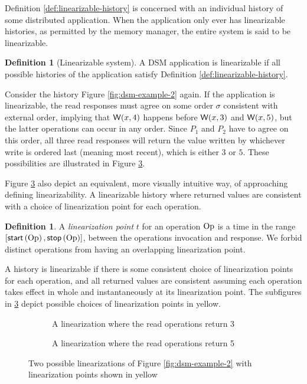 \documentclass[]             %
{NASA}                       %
\theoremstyle{definition}
\newtheorem{definition}[theorem]{Definition}
\begin{document}
Definition \ref{def:linearizable-history} is concerned with an individual
history of some distributed application. When the application only
ever has linearizable histories, as permitted by the memory manager,
the entire system is said to be linearizable.

\begin{definition}[Linearizable system]
  \label{def:linearizable-system}
  A DSM application is linearizable if all possible histories of the
  application satisfy Definition \ref{def:linearizable-history}.
\end{definition}

Consider the history Figure \ref{fig:dsm-example-2} again. If the
application is linearizable, the read responses must agree on some
order $\sigma$ consistent with external order, implying that
$\mathsf{W}\!\left(x, 4\right)$ happens before $\mathsf{W}\!\left(x, 3\right)$ and
$\mathsf{W}\!\left(x, 5\right)$, but the latter operations can occur in any
order. Since $P_1$ and $P_2$ have to agree on this order, all three
read responses will return the value written by whichever write is
ordered last (meaning most recent), which is either $3$ or $5$. These
possibilities are illustrated in Figure
\ref{fig:dsm-example-2-linearizations}.

Figure \ref{fig:dsm-example-2-linearizations} also depict an
equivalent, more visually intuitive way, of approaching defining
linearizability. A linearizable history where returned values are
consistent with a choice of linearization point for each operation.
\begin{definition}
  A \emph{linearization point} $t$ for an operation $\mathrm{Op}$ is a time in
  the range $[\mathsf{start}\left(\mathrm{Op}\right), \mathsf{stop}\left(\mathrm{Op}\right)]$, between the operations
  invocation and response. We forbid distinct operations from having
  an overlapping linearization point.
\end{definition}

A history is linearizable if there is some consistent choice of
linearization points for each operation, and all returned values are
consistent assuming each operation takes effect in whole and
instantaneously at its linearization point. The subfigures in
\ref{fig:dsm-example-2-linearizations} depict possible choices of
linearization points in yellow.

\begin{figure}
  \begin{subfigure}{1\textwidth}
    \setlength\belowcaptionskip{4ex}
    \centering
    
    \caption{A linearization where the read operations return 3}
    \label{fig:dsm-example-2-linearizations-1}
  \end{subfigure}
  \begin{subfigure}{1\textwidth}
    
        \caption{A linearization where the read operations return 5}
    \label{fig:dsm-example-2-linearizations-b}
  \end{subfigure}
  \caption{Two possible linearizations of Figure \ref{fig:dsm-example-2} with linearization points shown in yellow}
  \label{fig:dsm-example-2-linearizations}
\end{figure}
\end{document}
